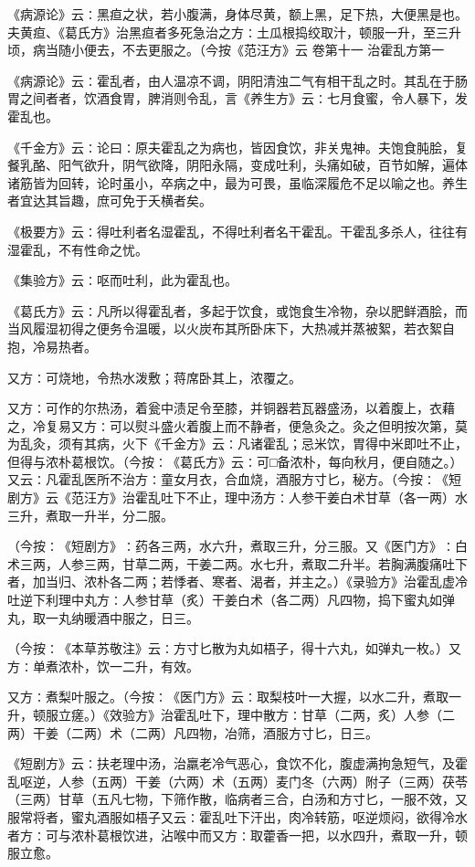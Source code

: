 \documentclass[a4paper,12pt,UTF8,twoside]{ctexbook}
\begin{document}
《病源论》云∶黑疸之状，若小腹满，身体尽黄，额上黑，足下热，大便黑是也。夫黄疸、《葛氏方》治黑疸者多死急治之方∶土瓜根捣绞取汁，顿服一升，至三升顷，病当随小便去，不去更服之。（今按《范汪方》云
卷第十一
治霍乱方第一

《病源论》云∶霍乱者，由人温凉不调，阴阳清浊二气有相干乱之时。其乱在于肠胃之间者者，饮酒食胃，脾消则令乱，言《养生方》云∶七月食蜜，令人暴下，发霍乱也。

《千金方》云∶论曰∶原夫霍乱之为病也，皆因食饮，非关鬼神。夫饱食肫脍，复餐乳酪、阳气欲升，阴气欲降，阴阳永隔，变成吐利，头痛如破，百节如解，遍体诸筋皆为回转，论时虽小，卒病之中，最为可畏，虽临深履危不足以喻之也。养生者宜达其旨趣，庶可免于夭横者矣。

《极要方》云∶得吐利者名湿霍乱，不得吐利者名干霍乱。干霍乱多杀人，往往有湿霍乱，不有性命之忧。

《集验方》云∶呕而吐利，此为霍乱也。

《葛氏方》云∶凡所以得霍乱者，多起于饮食，或饱食生冷物，杂以肥鲜酒脍，而当风履湿初得之便务令温暖，以火炭布其所卧床下，大热减并蒸被絮，若衣絮自抱，冷易热者。

又方∶可烧地，令热水泼敷；蒋席卧其上，浓覆之。

又方∶可作的尔热汤，着瓮中渍足令至膝，并铜器若瓦器盛汤，以着腹上，衣藉之，冷复易又方∶可以熨斗盛火着腹上而不静者，便急灸之。灸之但明按次第，莫为乱灸，须有其病，火下《千金方》云∶凡诸霍乱；忌米饮，胃得中米即吐不止，但得与浓朴葛根饮。（今按∶《葛氏方》云∶可□备浓朴，每向秋月，便自随之。）又云∶凡霍乱医所不治方∶童女月衣，合血烧，酒服方寸匕，秘方。（今按∶《短剧方》云《范汪方》治霍乱吐下不止，理中汤方∶人参干姜白术甘草（各一两）水三升，煮取一升半，分二服。

（今按∶《短剧方》∶药各三两，水六升，煮取三升，分三服。又《医门方》∶白术三两，人参三两，甘草二两，干姜二两。水七升，煮取二升半。若胸满腹痛吐下者，加当归、浓朴各二两；若悸者、寒者、渴者，并主之。）《录验方》治霍乱虚冷吐逆下利理中丸方∶人参甘草（炙）干姜白术（各二两）凡四物，捣下蜜丸如弹丸，取一丸纳暖酒中服之，日三。

（今按∶《本草苏敬注》云∶方寸匕散为丸如梧子，得十六丸，如弹丸一枚。）又方∶单煮浓朴，饮一二升，有效。

又方∶煮梨叶服之。（今按∶《医门方》云∶取梨枝叶一大握，以水二升，煮取一升，顿服立瘥。）《效验方》治霍乱吐下，理中散方∶甘草（二两，炙）人参（二两）干姜（二两）术（二两）凡四物，冶筛，酒服方寸匕，日三。

《短剧方》云∶扶老理中汤，治羸老冷气恶心，食饮不化，腹虚满拘急短气，及霍乱呕逆，人参（五两）干姜（六两）术（五两）麦门冬（六两）附子（三两）茯苓（三两）甘草（五凡七物，下筛作散，临病者三合，白汤和方寸匕，一服不效，又服常将者，蜜丸酒服如梧子又云∶霍乱吐下汗出，肉冷转筋，呕逆烦闷，欲得冷水者方∶可与浓朴葛根饮进，沾喉中而又方∶取藿香一把，以水四升，煮取一升，顿服立愈。
\end{document}
